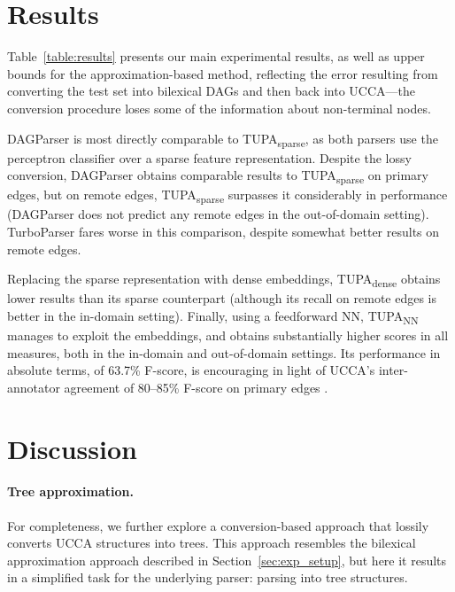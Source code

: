 \documentclass[11pt,a4paper]{article}
\newcommand{\parser}[1]{TUPA\textsubscript{#1}}
\newcommand{\secref}[1]{Section~\ref{#1}}
\newcommand{\tabref}[1]{Table~\ref{#1}}
\begin{document}
\section{Results}\label{sec:results}

\tabref{table:results} presents our main experimental results, as well as
upper bounds for the approximation-based method,
reflecting the error resulting from converting the test set into bilexical DAGs and then
back into UCCA---the conversion procedure loses some of the information about non-terminal nodes.

DAGParser is most directly comparable to \parser{sparse}, as both parsers
use the perceptron classifier over a sparse feature representation.
Despite the lossy conversion, DAGParser obtains comparable results to
\parser{sparse} on primary edges, but on remote edges, \parser{sparse}
surpasses it considerably in performance
(DAGParser does not predict any remote edges in the out-of-domain setting).
TurboParser fares worse in this comparison, despite somewhat better results on
remote edges.


Replacing the sparse representation with dense embeddings, \parser{dense} obtains
lower results than its sparse counterpart (although its recall on remote edges is
better in the in-domain setting).
Finally, using a feedforward NN, \parser{NN} manages to exploit the embeddings,
and obtains substantially higher scores in all measures, both
in the in-domain and out-of-domain settings.
Its performance in absolute terms, of 63.7\% F-score, is encouraging in light of
UCCA's inter-annotator agreement of 80--85\%
F-score on primary edges \cite{abend2013universal}.



\section{Discussion}\label{sec:discussion}

\paragraph{Tree approximation.}
For completeness, we further explore a conversion-based approach that
lossily converts UCCA structures into trees. 
This approach resembles the bilexical approximation approach described in \secref{sec:exp_setup}, but here it results in a simplified task for the underlying parser: parsing into tree structures.
\end{document}
